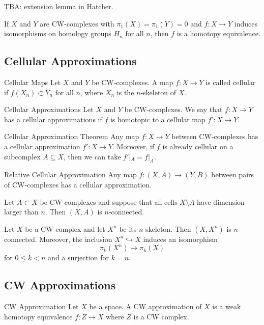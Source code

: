 \documentclass[a4paper]{article}
\begin{document}
TBA: extension lemma in Hatcher. 

\begin{crl}{}{} If $X$ and $Y$ are CW-complexes with $\pi_1(X)=\pi_1(Y)=0$ and $f:X\to Y$ induces isomorphisms on homology groups $H_n$ for all $n$, then $f$ is a homotopy equivalence. 
\end{crl}

\subsection{Cellular Approximations}
\begin{defn}{Cellular Maps}{} Let $X$ and $Y$ be CW-complexes. A map $f:X\to Y$ is called cellular if $f(X_n)\subset Y_n$ for all $n$, where $X_n$ is the $n$-skeleton of $X$. 
\end{defn}

\begin{defn}{Cellular Approximations}{} Let $X$ and $Y$ be CW-complexes. We say that $f:X\to Y$ has a cellular approximations if $f$ is homotopic to a cellular map $f':X\to Y$. 
\end{defn}

\begin{thm}{Cellular Approximation Theorem}{} Any map $f:X\to Y$ between CW-complexes has a cellular approximation $f':X\to Y$. Moreover, if $f$ is already cellular on a subcomplex $A\subseteq X$, then we can take $f'|_A=f|_A$. 
\end{thm}

\begin{thm}{Relative Cellular Approximation}{} Any map $f:(X,A)\to (Y,B)$ between pairs of CW-complexes has a cellular approximation. 
\end{thm}

\begin{crl}{}{} Let $A\subset X$ be CW-complexes and suppose that all cells $X\setminus A$ have dimension larger than $n$. Then $(X,A)$ is $n$-connected. 
\end{crl}

\begin{crl}{}{} Let $X$ be a CW complex and let $X^n$ be its $n$-skeleton. Then $(X,X^n)$ is $n$-connected. Moreover, the inclusion $X^n\hookrightarrow X$ induces an isomorphism $$\pi_k(X^n)\to\pi_k(X)$$ for $0\leq k<n$ and a surjection for $k=n$. 
\end{crl}

\subsection{CW Approximations}
\begin{defn}{CW Approximation}{} Let $X$ be a space. A CW approximation of $X$ is a weak homotopy equivalence $f:Z\to X$ where $Z$ is a CW complex. 
\end{defn}
\end{document}
